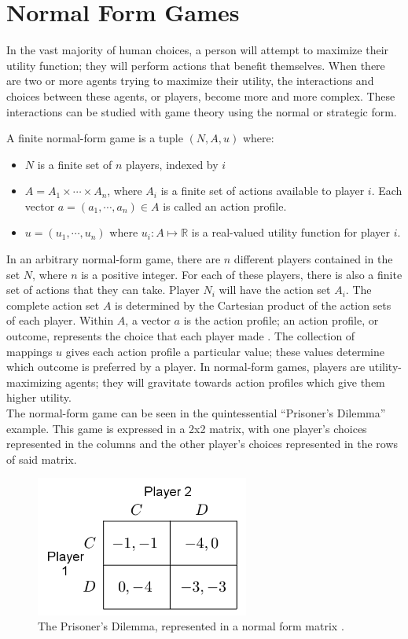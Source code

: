 \section{Normal Form Games}
In the vast majority of human choices, a person will attempt to maximize their utility function; they will perform actions that benefit themselves. When there are two or more agents trying to maximize their utility, the interactions and choices between these agents, or players, become more and more complex. These interactions can be studied with game theory using the normal or strategic form.
\begin{define}
  A finite normal-form game is a tuple $(N, A, u)$ where:
  \begin{itemize}
  \item $N$ is a finite set of $n$ players, indexed by $i$
  \item $A=A_1\times\cdots\times A_n$, where $A_i$ is a finite set of actions available to player $i$. Each vector $a=(a_1,\cdots ,a_n)\in A$ is called an action profile.
    \item $u=(u_1,\cdots ,u_n)$ where $u_i : A \mapsto\mathbb{R}$ is a real-valued utility function for player $i$.
\end{itemize}
\end{define}

In an arbitrary normal-form game, there are $n$ different players contained in the set $N$, where $n$ is a positive integer. For each of these players, there is also a finite set of actions that they can take. Player $N_i$ will have the action set $A_i$. The complete action set $A$ is determined by the Cartesian product of the action sets of each player. Within $A$, a vector $a$ is the action profile; an action profile, or outcome, represents the choice that each player made \cite{osbo94}. The collection of mappings $u$ gives each action profile a particular value; these values determine which outcome is preferred by a player. In normal-form games, players are utility-maximizing agents; they will gravitate towards action profiles which give them higher utility.\\

The normal-form game can be seen in the quintessential ``Prisoner's Dilemma'' example. This game is expressed in a 2x2 matrix, with one player's choices represented in the columns and the other player's choices represented in the rows of said matrix.

\begin{figure}[H]
  \centering
  \includegraphics[width=7cm]{figures/ExampleGrid.png}
  \caption{The Prisoner's Dilemma, represented in a normal form matrix \cite{shoh09}.}
  \label{fig:prisoner}
\end{figure}

